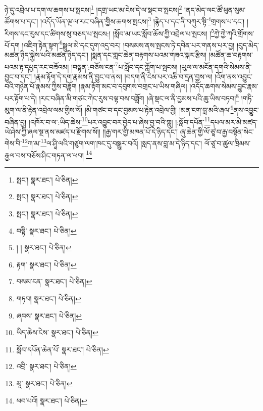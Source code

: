 ཉེ་དུ་འབྲེལ་པ་དག་ལ་ཆགས་པ་སྤངས།\footnote{སྤང་།  སྣར་ཐང་།  པེ་ཅིན། } །དགྲ་ཡང་མ་ངེས་དེ་ལ་སྡང་བ་སྤངས།\footnote{སྤང་།  སྣར་ཐང་།  པེ་ཅིན། } །ནད་མེད་ལང་ཚོ་ཕུན་སུམ་ཚོགས་པ་དང་། །འདོད་ཡོན་ལྔ་ལ་རང་བཞིན་གྱིས་ཆགས་སྤངས།\footnote{སྤང་།  སྣར་ཐང་།  པེ་ཅིན། } །རྙེད་པ་དང་ནི་བཀུར་སྟི་\footnote{བསྟི་  སྣར་ཐང་།  པེ་ཅིན། }གྲགས་པ་དང་། །རིགས་དང་རུས་དང་ཚིགས་སུ་བཅད་པ་སྤངས:། །སློབ་མ་ཡང་སློབ་ཆོས་ཀྱི་འབྲེལ་པ་སྤངས། །\footnote{། །  སྣར་ཐང་།  པེ་ཅིན། }ཀྱེ་ཀྱེ་ཀྭའི་གྲོགས་པོ་དག །འཇིག་རྟེན་སྟག་\footnote{རྟག་  སྣར་ཐང་།  པེ་ཅིན། }སྦྲུལ་མེ་དང་དུག་འདྲ་བར། །བསམས་ནས་སྤངས་ཏེ་དབེན་པར་གནས་པར་བྱ། །བུད་མེད་མཚན་ཉིད་སྐྱེས་པའི་མཚན་ཉིད་དང་། །སྨན་དང་གླང་ཆེན་བརྟགས་པའམ་གཟའ་སྐར་རྩིས། །མཚོན་ཆ་བརྟགས་པའམ་རྟ་དཔྱད་རང་བཟོའམ། །བསྟན་:བཅོས་ངན་\footnote{བསམ་ངན་  སྣར་ཐང་།  པེ་ཅིན། }པ་སློབ་དང་ཀློག་པ་སྤངས། །ཡུལ་ལ་མངོན་དགའི་སེམས་ནི་བྱུང་བ་དང་། །རྣམ་རྟོག་དེ་དག་རྣམས་ནི་བྱུང་བ་ནས། །བདག་ནི་ངེས་པར་འཆི་བ་དྲན་བྱས་ལ། །འོག་ནས་འབྱུང་བའི་གཉེན་པོ་རྣམས་ཀྱིས་བཟློག །རྣམ་རྟོག་མང་བ་དབུགས་བགྲང་པ་ཡིས་གཞིལ། །འདོད་ཆགས་སེམས་བྱུང་རྣམ་པར་རྟོག་པ་དེ། །རང་བཞིན་མི་གཙང་ཀེང་རུས་བལྟ་བས་བཟློག །ཞེ་སྡང་ལ་ནི་བྱམས་པའི་ཆུ་ཡིས་བཏབ།\footnote{གཏབ།  སྣར་ཐང་།  པེ་ཅིན། } །གཏི་མུག་ལ་ནི་རྟེན་འབྲེལ་ལམ་གྱིས་སོ། །མི་གཙང་བ་དང་བྱམས་པ་རྟེན་འབྲེལ་གྱི། །མན་ངག་བླ་མའི་ཞལ་\footnote{ཞབས་  སྣར་ཐང་།  པེ་ཅིན། }ནས་འབྱུང་བཞིན་བྱ། །འཁོར་བ་ལ་:ཡིད་ཆེས་\footnote{ཡིད་ཆེས་ངེས་  སྣར་ཐང་།  པེ་ཅིན། }པར་འབྱུང་བར་བྱེད་པ་ཞེས་བྱ་བའི་གླུ། །:སློབ་དཔོན་\footnote{སློབ་དཔོན་ཆེན་པོ་  སྣར་ཐང་།  པེ་ཅིན། }དཔལ་མར་མེ་མཛད་ཡེ་ཤེས་ཀྱི་ཞལ་སྔ་ནས་མཛད་པ་རྫོགས་སོ།། །།རྒྱ་གར་གྱི་མཁན་པོ་དེ་ཉིད་དང་། ཞུ་ཆེན་གྱི་ལོ་ཙཱ་བ་རྒྱ་བསྟོན་སེང་གེས་བི་\footnote{འབྲི་  སྣར་ཐང་།  པེ་ཅིན། }ཀ་མ་\footnote{མཱ་  སྣར་ཐང་།  པེ་ཅིན། }ལ་ཤཱི་ལའི་གཙུག་ལག་ཁང་དུ་བསྒྱུར་བའོ། །སླད་ནས་བླ་མ་དེ་ཉིད་དང་། ལོ་ཙཱ་བ་ཚུལ་ཁྲིམས་རྒྱལ་བས་བཅོས་ཤིང་གཏན་ལ་ཕབ། \footnote{ཕབ་པའོ།   སྣར་ཐང་།  པེ་ཅིན། }